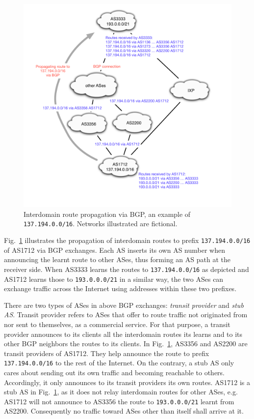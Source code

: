 \begin{figure}[!htb]
\centering
\includegraphics[width=1.1\textwidth]{gfx/chap1/bgp_route_propagation.pdf}
\caption{Interdomain route propagation via \ac{BGP}, an example of \texttt{137.194.0.0/16}. Networks illustrated are fictional.}
\label{fig:bgp_propa}
\end{figure}

Fig.~\ref{fig:bgp_propa} illustrates the propagation of interdomain routes to prefix \texttt{137.194.0.0/16} of AS1712 via BGP exchanges. Each AS inserts its own AS number when announcing the learnt route to other ASes, thus forming an AS path at the receiver side. When AS3333 learns the routes to \texttt{137.194.0.0/16} as depicted and AS1712 learns those to \texttt{193.0.0.0/21} in a similar way, the two ASes can exchange traffic across the Internet using addresses within these two prefixes.

There are two types of ASes in above BGP exchanges: \textit{transit provider} and \textit{stub AS}.
Transit provider refers to ASes that offer to route traffic not originated from nor sent to themselves, as a commercial service.
For that purpose, a transit provider announces to its clients all the interdomain routes its learns and to its other BGP neighbors the routes to its clients.
In Fig.~\ref{fig:bgp_propa}, AS3356 and AS2200 are transit providers of AS1712. They help announce the route to prefix \texttt{137.194.0.0/16}
to the rest of the Internet.
On the contrary, a stub AS only cares about sending out its own traffic and becoming reachable to others.
Accordingly, it only announces to its transit providers its own routes. AS1712 is a stub AS in Fig.~\ref{fig:bgp_propa}, as it does not relay interdomain routes for other ASes, e.g. AS1712 will not announce to AS3356 the route to \texttt{193.0.0.0/21} learnt from AS2200. Consequently no traffic toward ASes other than itself shall arrive at it.

